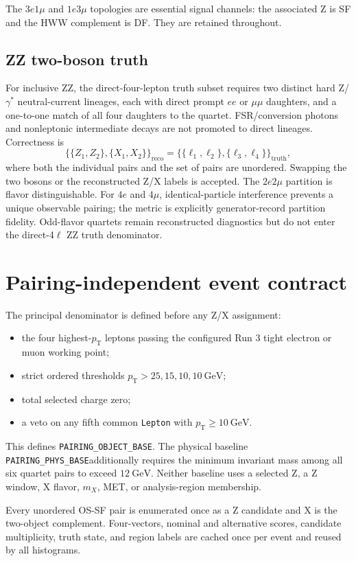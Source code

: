 \documentclass[11pt]{article}
\newcommand{\mX}{m_{X}}
\newcommand{\pt}{p_{\mathrm{T}}}
\newcommand{\physbase}{\texttt{PAIRING\_PHYS\_BASE}}
\newcommand{\objectbase}{\texttt{PAIRING\_OBJECT\_BASE}}
\begin{document}
The $3e1\mu$ and $1e3\mu$ topologies are essential signal channels: the
associated Z is SF and the HWW complement is DF.  They are retained throughout.

\subsection{ZZ two-boson truth}

For inclusive ZZ, the direct-four-lepton truth subset requires two distinct
hard Z/$\gamma^{*}$ neutral-current lineages, each with direct prompt
$ee$ or $\mu\mu$ daughters, and a one-to-one match of all four daughters to
the quartet.  FSR/conversion photons and nonleptonic intermediate decays are
not promoted to direct lineages.  Correctness is
\[
 \bigl\{\{Z_1,Z_2\},\{X_1,X_2\}\bigr\}_{\mathrm{reco}}
 =
 \bigl\{\{\ell_1,\ell_2\},\{\ell_3,\ell_4\}\bigr\}_{\mathrm{truth}},
\]
where both the individual pairs and the set of pairs are unordered.  Swapping
the two bosons or the reconstructed Z/X labels is accepted.  The $2e2\mu$
partition is flavor distinguishable.  For $4e$ and $4\mu$, identical-particle
interference prevents a unique observable pairing; the metric is explicitly
generator-record partition fidelity.  Odd-flavor quartets remain reconstructed
diagnostics but do not enter the direct-4$\ell$ ZZ truth denominator.

\section{Pairing-independent event contract}

The principal denominator is defined before any Z/X assignment:
\begin{itemize}
  \item the four highest-$\pt$ leptons passing the configured Run 3 tight
        electron or muon working point;
  \item strict ordered thresholds $\pt>25,15,10,10\ \mathrm{GeV}$;
  \item total selected charge zero;
  \item a veto on any fifth common \texttt{Lepton} with $\pt\geq10\ \mathrm{GeV}$.
\end{itemize}
This defines \objectbase.  The physical baseline \physbase additionally
requires the minimum invariant mass among all six quartet pairs to exceed
$12\ \mathrm{GeV}$.  Neither baseline uses a selected Z, a Z window, X flavor,
$\mX$, MET, or analysis-region membership.

Every unordered OS-SF pair is enumerated once as a Z candidate and X is the
two-object complement.  Four-vectors, nominal and alternative scores,
candidate multiplicity, truth state, and region labels are cached once per
event and reused by all histograms.
\end{document}
